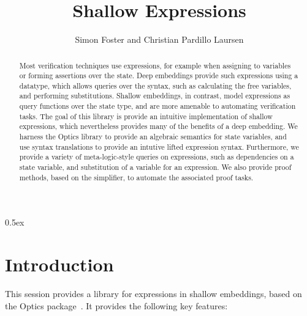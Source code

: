 \documentclass[11pt,a4paper]{article}
\begin{document}
\title{Shallow Expressions}
\author{Simon Foster and Christian Pardillo Laursen}
\maketitle

\begin{abstract}
\noindent Most verification techniques use expressions, for example when assigning to variables or 
forming assertions over the state. Deep embeddings provide such expressions using a datatype, which 
allows queries over the syntax, such as calculating the free variables, and performing substitutions. 
Shallow embeddings, in contrast, model expressions as query functions over the state type, and are 
more amenable to automating verification tasks. The goal of this library is provide an intuitive 
implementation of shallow expressions, which nevertheless provides many of the benefits of a deep 
embedding. We harness the Optics library to provide an algebraic semantics for state variables,
and use syntax translations to provide an intutive lifted expression syntax. Furthermore, we
provide a variety of meta-logic-style queries on expressions, such as dependencies
on a state variable, and substitution of a variable for an expression. We also provide proof 
methods, based on the simplifier, to automate the associated proof tasks.
\end{abstract}

\tableofcontents

\parindent 0pt\parskip 0.5ex

\section{Introduction}

This session provides a library for expressions in shallow embeddings, based on the Optics
package~\cite{Optics-AFP}. It provides the following key features:
\end{document}
